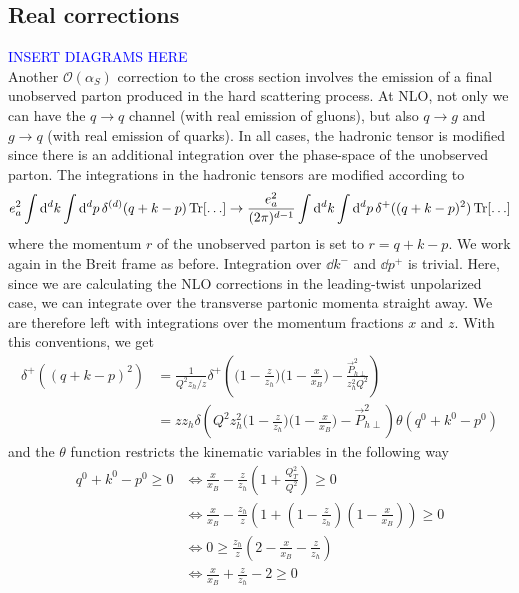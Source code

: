 \subsection{Real corrections}
\textcolor{blue}{INSERT DIAGRAMS HERE}\\
Another $\mathcal{O}(\alpha_S)$ correction to the cross section involves the emission of a final unobserved parton produced in the hard scattering process. At NLO, not only we can have the $q \to q$ channel (with real emission of gluons), but also $q \to g$ and $g \to q$ (with real emission of quarks). In all cases, the hadronic tensor is modified since there is an additional integration over the phase-space of the unobserved parton. The integrations in the hadronic tensors are modified according to
\begin{equation}
\begin{aligned}e_a^2 \int \dd^dk\int \dd^dp\,\delta^{(d)}(q+k-p)\Tr[\dots]  \to\frac{e_a^2}{(2\pi)^{d-1}} \int \dd^dk\int \dd^dp\,\delta^+((q+k-p)^2)\Tr[\dots]
\end{aligned}
\end{equation}
where the momentum $r$ of the unobserved parton is set to $r=q+k-p$. We work again in the Breit frame as before. Integration over $\dd k^-$ and $\dd p^+$ is trivial. Here, since we are calculating the NLO corrections in the leading-twist unpolarized case, we can integrate over the transverse partonic momenta straight away. We are therefore left with integrations over the momentum fractions $x$ and $z$. With this conventions, we get \cite{koike_transverse_2022} 
\begin{equation}
\begin{aligned}
     \delta^+((q+k-p)^2)&=\frac{1}{Q^2z_h/z}\delta^+\left( \Big(1-\frac{z}{z_h} \Big)\Big(1-\frac{x}{x_B}\Big)-\frac{\vec P_{h\perp}^2}{z_h^2Q^2}\right)\\
     &=z z_h\delta\left(Q^2z_h^2\Big(1-\frac{z}{z_h} \Big)\Big(1-\frac{x}{x_B}\Big) - \vec P_{h\perp}^2\right)\theta(q^0+k^0-p^0)
\end{aligned}
\end{equation}
and the $\theta$ function restricts the kinematic variables in the following way
\begin{equation}\label{eq:NLOrealtw2_theta function condition}
    \begin{aligned}
        q^0+k^0-p^0\ge 0 & \iff \frac{x}{x_B}-\frac{z}{z_h}\left(1+\frac{Q_T^2}{Q^2}\right)\ge 0\\
        &\iff \frac{x}{x_B}-\frac{z_h}{z}\left(1+\left(1-\frac{z}{z_h}\right)\left(1-\frac{x}{x_B}\right)\right)\ge0\\
        & \iff 0\ge \frac{z_h}{z}\left(2-\frac{x}{x_B}-\frac{z}{z_h}\right)\\
        & \iff \frac{x}{x_B}+\frac{z}{z_h}-2\ge 0
    \end{aligned}
\end{equation}
